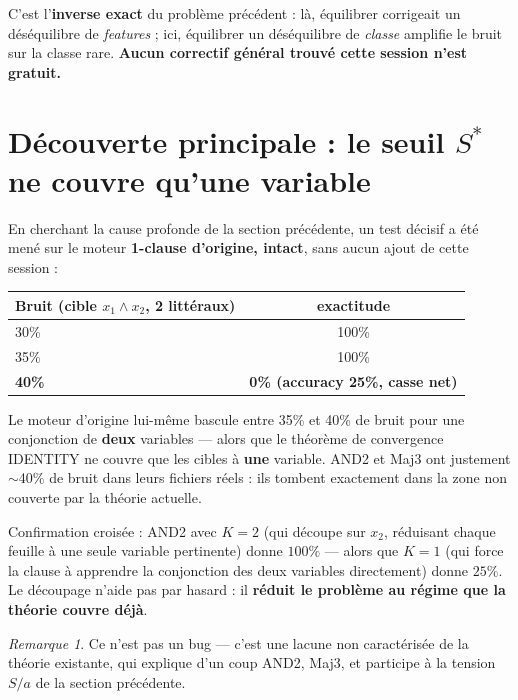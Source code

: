 \documentclass[12pt,a4paper]{article}
\theoremstyle{remark}
\newtheorem{remark}{Remarque}[section]
\newcommand{\Sstar}{S^{*}}
\begin{document}
C'est l'\textbf{inverse exact} du problème précédent : là, équilibrer
corrigeait un déséquilibre de \emph{features} ; ici, équilibrer un
déséquilibre de \emph{classe} amplifie le bruit sur la classe rare.
\textbf{Aucun correctif général trouvé cette session n'est gratuit.}

\section{Découverte principale : le seuil $\Sstar$ ne couvre qu'une variable}
\label{sec:seuil-sstar}

En cherchant la cause profonde de la section précédente, un test décisif a
été mené sur le moteur \textbf{1-clause d'origine, intact}, sans aucun ajout
de cette session :

\begin{center}
\begin{tabular}{@{}lc@{}}
\toprule
Bruit (cible $x_1 \wedge x_2$, 2 littéraux) & exactitude \\
\midrule
30\% & 100\% \\
35\% & 100\% \\
\textbf{40\%} & \textbf{0\% (accuracy 25\%, casse net)} \\
\bottomrule
\end{tabular}
\end{center}

Le moteur d'origine lui-même bascule entre 35\% et 40\% de bruit pour une
conjonction de \textbf{deux} variables --- alors que le théorème de
convergence IDENTITY ne couvre que les cibles à \textbf{une} variable. AND2
et Maj3 ont justement $\sim$40\% de bruit dans leurs fichiers réels : ils
tombent exactement dans la zone non couverte par la théorie actuelle.

Confirmation croisée : AND2 avec $K=2$ (qui découpe sur $x_2$, réduisant
chaque feuille à une seule variable pertinente) donne $100\%$ --- alors que
$K=1$ (qui force la clause à apprendre la conjonction des deux variables
directement) donne $25\%$. Le découpage n'aide pas par hasard : il
\textbf{réduit le problème au régime que la théorie couvre déjà}.

\begin{remark}
Ce n'est pas un bug --- c'est une lacune non caractérisée de la théorie
existante, qui explique d'un coup AND2, Maj3, et participe à la tension
$S/a$ de la section précédente.
\end{remark}
\end{document}
